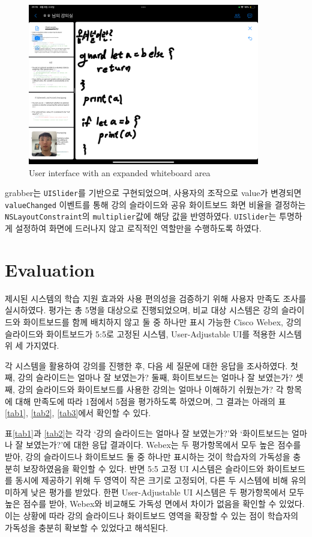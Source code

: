 \documentclass[pdflatex,sn-mathphys-num]{sn-jnl}%
\theoremstyle{thmstyleone}%
\theoremstyle{thmstyletwo}%
\theoremstyle{thmstylethree}%
\begin{document}
\begin{figure}[H]
\centering
\includegraphics[width=0.9\textwidth]{UserInterfaceWithAnExpandedWhiteboardArea.PNG}
\caption{User interface with an expanded whiteboard area}\label{fig8}
\end{figure}

\noindent
grabber는 \verb+UISlider+를 기반으로 구현되었으며, 사용자의 조작으로 value가 변경되면 \verb+valueChanged+ 이벤트를 통해 강의 슬라이드와 공유 화이트보드 화면 비율을 결정하는 \verb+NSLayoutConstraint+의 \verb+multiplier+값에 해당 값을 반영하였다. \verb+UISlider+는 투명하게 설정하여 화면에 드러나지 않고 로직적인 역할만을 수행하도록 하였다.

\section{Evaluation}\label{sec4}

제시된 시스템의 학습 지원 효과와 사용 편의성을 검증하기 위해 사용자 만족도 조사를 실시하였다. 평가는 총 5명을 대상으로 진행되었으며, 비교 대상 시스템은 강의 슬라이드와 화이트보드를 함께 배치하지 않고 둘 중 하나만 표시 가능한 Cisco Webex, 강의 슬라이드와 화이트보드가 5:5로 고정된 시스템, User-Adjustable UI를 적용한 시스템 위 세 가지였다.

각 시스템을 활용하여 강의를 진행한 후, 다음 세 질문에 대한 응답을 조사하였다. 첫째, 강의 슬라이드는 얼마나 잘 보였는가? 둘째, 화이트보드는 얼마나 잘 보였는가? 셋째, 강의 슬라이드와 화이트보드를 사용한 강의는 얼마나 이해하기 쉬웠는가? 각 항목에 대해 만족도에 따라 1점에서 5점을 평가하도록 하였으며, 그 결과는 아래의 표\ref{tab1}, \ref{tab2}, \ref{tab3}에서 확인할 수 있다.

표\ref{tab1}과 \ref{tab2}는 각각 `강의 슬라이드는 얼마나 잘 보였는가?'와 `화이트보드는 얼마나 잘 보였는가?'에 대한 응답 결과이다. Webex는 두 평가항목에서 모두 높은 점수를 받아, 강의 슬라이드나 화이트보드 둘 중 하나만 표시하는 것이 학습자의 가독성을 충분히 보장하였음을 확인할 수 있다. 반면 5:5 고정 UI 시스템은 슬라이드와 화이트보드를 동시에 제공하기 위해 두 영역이 작은 크기로 고정되어, 다른 두 시스템에 비해 유의미하게 낮은 평가를 받았다. 한편 User-Adjustable UI 시스템은 두 평가항목에서 모두 높은 점수를 받아, Webex와 비교해도 가독성 면에서 차이가 없음을 확인할 수 있었다. 이는 상황에 따라 강의 슬라이드나 화이트보드 영역을 확장할 수 있는 점이 학습자의 가독성을 충분히 확보할 수 있었다고 해석된다.
\end{document}
